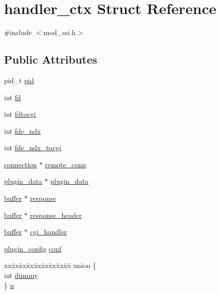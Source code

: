 \hypertarget{structhandler__ctx}{\section{handler\-\_\-ctx Struct Reference}
\label{structhandler__ctx}
}


{\ttfamily \#include $<$mod\-\_\-ssi.\-h$>$}

\subsection*{Public Attributes}
\begin{DoxyCompactItemize}
\item 
pid\-\_\-t \hyperlink{structhandler__ctx_a6e0de4aab03a623effbf0a5721982c46}{pid}
\item 
int \hyperlink{structhandler__ctx_aabb04ed64f0b8ca7a1300025ff452fbf}{fd}
\item 
int \hyperlink{structhandler__ctx_a0b203101a15edf6179c53ca1949a380f}{fdtocgi}
\item 
int \hyperlink{structhandler__ctx_a5625d49590c89234b20e0e652f215fa8}{fde\-\_\-ndx}
\item 
int \hyperlink{structhandler__ctx_a3da16808a01c8c78593b5484347a34f6}{fde\-\_\-ndx\-\_\-tocgi}
\item 
\hyperlink{structconnection}{connection} $\ast$ \hyperlink{structhandler__ctx_a2ebe985a0115f4351cd85a6ba2aae8d5}{remote\-\_\-conn}
\item 
\hyperlink{structplugin__data}{plugin\-\_\-data} $\ast$ \hyperlink{structhandler__ctx_a04c4044ac96d072dc2eba4f3cbcf71ed}{plugin\-\_\-data}
\item 
\hyperlink{structbuffer}{buffer} $\ast$ \hyperlink{structhandler__ctx_a557457324a347639343f267ed75a0cab}{response}
\item 
\hyperlink{structbuffer}{buffer} $\ast$ \hyperlink{structhandler__ctx_a068867a5689012825e5eeb6ef432b1eb}{response\-\_\-header}
\item 
\hyperlink{structbuffer}{buffer} $\ast$ \hyperlink{structhandler__ctx_a384e9a520fc6a9ee8aa522e9059cd165}{cgi\-\_\-handler}
\item 
\hyperlink{structplugin__config}{plugin\-\_\-config} \hyperlink{structhandler__ctx_a33b75582dd79020a83e029ff2ab56db3}{conf}
\item 
\begin{tabbing}
xx\=xx\=xx\=xx\=xx\=xx\=xx\=xx\=xx\=\kill
union \{\\
\>int \hyperlink{structhandler__ctx_ad94377aa5408f430d287b91bc173526d}{dummy}\\
\} \hyperlink{structhandler__ctx_a131bf09a0cc6196b4dfad94cc76b0507}{u}\\


\end{tabbing}
\end{DoxyCompactItemize}
